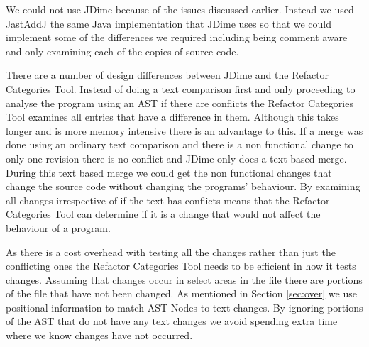 We could not use JDime because of the issues discussed earlier. Instead we used JastAddJ the same Java implementation that JDime uses so that we could implement some of the differences we required including being comment aware and only examining each of the copies of source code.

There are a number of design differences between JDime and the Refactor Categories Tool.
 Instead of doing a text comparison first and only proceeding to analyse the program using an AST if there are conflicts the Refactor Categories Tool examines all entries that have a difference in them.
Although this takes longer and is more memory intensive there is an advantage to this.  
If a merge was done using an ordinary text comparison and there is a non functional change to only one revision there is no conflict and JDime only does a text based merge.  
During this text based merge we could get the non functional changes that change the source code without changing the programs' behaviour. By examining all changes irrespective of if the text has conflicts means that the Refactor Categories Tool can determine if it is a change that would not affect the behaviour of a program.

As there is a cost overhead with testing all the changes rather than just the conflicting ones the Refactor Categories Tool needs to be efficient in how it tests changes.  Assuming that changes occur in select areas in the file there are portions of the file that have not been changed.  
As mentioned in Section \ref{sec:over} we use positional information to match AST Nodes to text changes.  By ignoring portions of the AST that do not have any text changes we avoid spending extra time where we know changes have not occurred.

